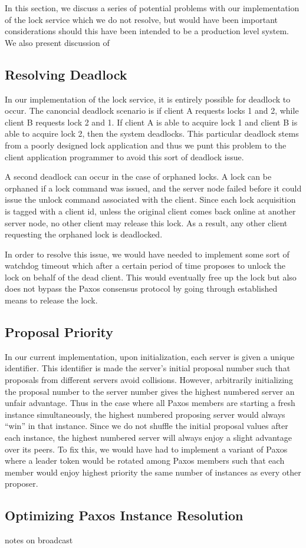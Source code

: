 \documentclass{article}
\begin{document}
In this section, we discuss a series of potential problems with our implementation of the lock service which we do not resolve, but would have been important considerations should this have been intended to be a production level system.
We also present discussion of

\subsection{Resolving Deadlock}

In our implementation of the lock service, it is entirely possible for deadlock to occur.
The canoncial deadlock scenario is if client A requests locks 1 and 2, while client B requests lock 2 and 1.
If client A is able to acquire lock 1 and client B is able to acquire lock 2, then the system deadlocks.
This particular deadlock stems from a poorly designed lock application and thus we punt this problem to the client application programmer to avoid this sort of deadlock issue.

A second deadlock can occur in the case of orphaned locks.
A lock can be orphaned if a lock command was issued, and the server node failed before it could issue the unlock command associated with the client.
Since each lock acquisition is tagged with a client id, unless the original client comes back online at another server node, no other client may release this lock.
As a result, any other client requesting the orphaned lock is deadlocked.

In order to resolve this issue, we would have needed to implement some sort of watchdog timeout which after a certain period of time proposes to unlock the lock on behalf of the dead client.
This would eventually free up the lock but also does not bypass the Paxos consensus protocol by going through established means to release the lock.

\subsection{Proposal Priority}

In our current implementation, upon initialization, each server is given a unique identifier.
This identifier is made the server's initial proposal number such that proposals from different servers avoid collisions.
However, arbitrarily initializing the proposal number to the server number gives the highest numbered server an unfair advantage.
Thus in the case where all Paxos members are starting a fresh instance simultaneously, the highest numbered proposing server would always ``win'' in that instance.
Since we do not shuffle the initial proposal values after each instance, the highest numbered server will always enjoy a slight advantage over its peers.
To fix this, we would have had to implement a variant of Paxos where a leader token would be rotated among Paxos members such that each member would enjoy highest priority the same number of instances as every other proposer.

\subsection{Optimizing Paxos Instance Resolution}

notes on broadcast
\end{document}
